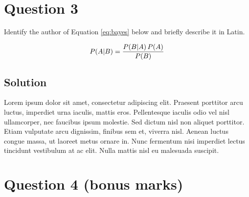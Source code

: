 \documentclass[
  UTF8, %
  12pt, %
]{assignment}
\begin{document}

\section*{Question 3}

\begin{problem}
Identify the author of Equation \eqref{eq:bayes} below and briefly describe it in Latin.

\medskip

\begin{equation}\label{eq:bayes}
  P \qty( A \middle| B ) = \frac{ P \qty( B \middle| A ) \, P (A)}{P (B)}
\end{equation}

\smallskip
\end{problem}


\subsection*{Solution}

Lorem ipsum dolor sit amet, consectetur adipiscing elit. Praesent porttitor arcu luctus, imperdiet urna iaculis, mattis eros. Pellentesque iaculis odio vel nisl ullamcorper, nec faucibus ipsum molestie. Sed dictum nisl non aliquet porttitor. Etiam vulputate arcu dignissim, finibus sem et, viverra nisl. Aenean luctus congue massa, ut laoreet metus ornare in. Nunc fermentum nisi imperdiet lectus tincidunt vestibulum at ac elit. Nulla mattis nisl eu malesuada suscipit.


\section*{Question 4 (bonus marks)}
\end{document}
